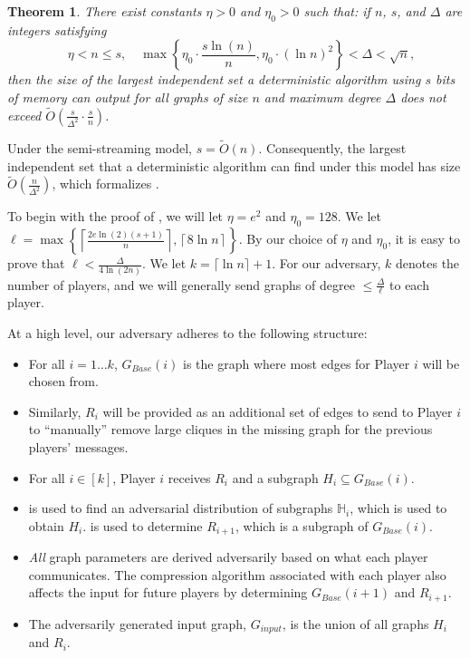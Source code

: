 \documentclass[11pt]{article}
\newtheorem{theorem}{Theorem}
\theoremstyle{definition}
\renewcommand{\leq}{\leqslant}
\renewcommand{\le}{\leq}
\newcommand{\Ot}{\ensuremath{\widetilde{O}}}
\begin{document}
\begin{theorem}\label{main-theorem}
    There exist constants $\eta>0$ and $\eta_0>0$ such that: if $n$, $s$, and $\Delta$ are integers satisfying
    \[ \quad \eta<n\le s, \quad \max\left\{\eta_0\cdot \frac{s\ln(n)}n, \eta_0\cdot {(\ln n)}^2 \right \}< \Delta < \sqrt n,\]
    then the size of the largest independent set a deterministic algorithm using $s$ bits of memory can output for all graphs of size $n$ and maximum degree $\Delta$ does not exceed $\Ot\left(\frac s{\Delta^2}\cdot \frac sn\right)$. 
\end{theorem}

Under the semi-streaming model, $s=\Ot(n)$. Consequently, the largest independent set that a deterministic algorithm can find under this model has size $\Ot\left(\frac n{\Delta^2}\right)$, which formalizes .

\newcommand{\distribFac}{\ell}

To begin with the proof of , we will let $\eta=e^2$ and $\eta_0=128$. We let ${\distribFac}=\max\left\{\left\lceil\frac{2e\ln(2)(s+1)}n \right\rceil, \left\lceil8\ln n\right\rceil\right\}$. By our choice of $\eta$ and $\eta_0$, it is easy to prove that ${\distribFac}<\frac{\Delta}{4\ln(2n)}$. We let $k=\lceil \ln n\rceil +1$. For our adversary, $k$ denotes the number of players, and we will generally send graphs of degree $\le \frac{\Delta}{\distribFac}$ to each player. 

At a high level, our adversary adheres to the following structure:
\begin{itemize}
    \item For all $i=1\dots k$, $G_{Base}(i)$ is the graph where most edges for Player $i$ will be chosen from.
    \item Similarly, $R_i$ will be provided as an additional set of edges to send to Player $i$ to ``manually'' remove large cliques in the missing graph for the previous players' messages. 
    \item For all $i\in [k]$, Player $i$ receives $R_i$ and a subgraph $H_i\subseteq G_{Base}(i)$. 
    \item {} is used to find an adversarial distribution of subgraphs $\mathbb{H}_i$, which is used to obtain $H_i$.  is used to determine $R_{i+1}$, which is a subgraph of $G_{Base}(i)$.
    \item \textit{All} graph parameters are derived adversarily based on what each player communicates. The compression algorithm associated with each player also affects the input for future players by determining $G_{Base}(i+1)$ and $R_{i+1}$.
    \item The adversarily generated input graph, $G_{input}$, is the union of all graphs $H_i$ and $R_i$. 
\end{itemize}
\end{document}
